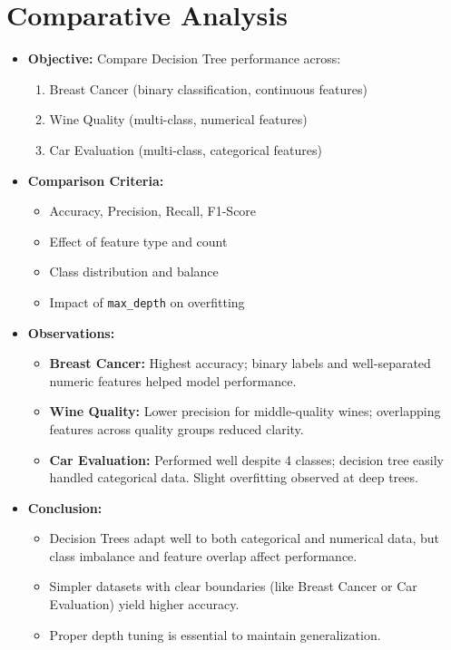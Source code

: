 \section{Comparative Analysis}

\begin{itemize}
	\item \textbf{Objective:} Compare Decision Tree performance across:
	      \begin{enumerate}
		      \item Breast Cancer (binary classification, continuous features)
		      \item Wine Quality (multi-class, numerical features)
		      \item Car Evaluation (multi-class, categorical features)
	      \end{enumerate}

	\item \textbf{Comparison Criteria:}
	      \begin{itemize}
		      \item Accuracy, Precision, Recall, F1-Score
		      \item Effect of feature type and count
		      \item Class distribution and balance
		      \item Impact of \texttt{max\_depth} on overfitting
	      \end{itemize}

	\item \textbf{Observations:}
	      \begin{itemize}
		      \item \textbf{Breast Cancer:} Highest accuracy; binary labels and well-separated numeric features helped model performance.
		      \item \textbf{Wine Quality:} Lower precision for middle-quality wines; overlapping features across quality groups reduced clarity.
		      \item \textbf{Car Evaluation:} Performed well despite 4 classes; decision tree easily handled categorical data. Slight overfitting observed at deep trees.
	      \end{itemize}

	\item \textbf{Conclusion:}
	      \begin{itemize}
		      \item Decision Trees adapt well to both categorical and numerical data, but class imbalance and feature overlap affect performance.
		      \item Simpler datasets with clear boundaries (like Breast Cancer or Car Evaluation) yield higher accuracy.
		      \item Proper depth tuning is essential to maintain generalization.
	      \end{itemize}
\end{itemize}
